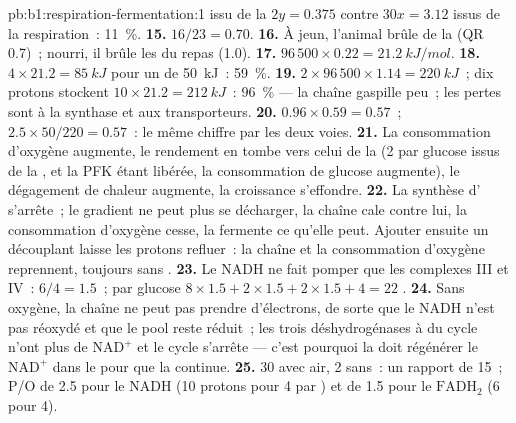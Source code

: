 \begin{solution}{pb:b1:respiration-fermentation:1}
issu de la  $2y = 0.375$ contre $30x = 3.12$ issus de la
respiration~: \qty{11}{\%}.
\textbf{15.} $16/23 = 0.70$.
\textbf{16.} À jeun, l'animal brûle de la  (QR 0.7)~; nourri, il
brûle les  du repas (1.0).
\textbf{17.} $96\,500\times 0.22 = \qty{21.2}{kJ/mol}$.
\textbf{18.} $4\times 21.2 = \qty{85}{kJ}$ pour un  de \qty{50}{kJ}~:
\qty{59}{\%}.
\textbf{19.} $2\times 96\,500\times 1.14 = \qty{220}{kJ}$~; dix protons
stockent $10\times 21.2 = \qty{212}{kJ}$~: \qty{96}{\%} --- la chaîne
gaspille peu~; les pertes sont à la synthase et aux transporteurs.
\textbf{20.} $0.96\times 0.59 = 0.57$~; $2.5\times 50/220 = 0.57$~: le
même chiffre par les deux voies.
\textbf{21.} La consommation d'oxygène augmente, le rendement en 
tombe vers celui de la  (2 par glucose issus de la
, et la PFK étant libérée, la consommation de glucose
augmente), le dégagement de chaleur augmente, la croissance s'effondre.
\textbf{22.} La synthèse d' s'arrête~; le gradient ne peut plus se
décharger, la chaîne cale contre lui, la consommation d'oxygène cesse,
la  fermente ce qu'elle peut. Ajouter ensuite un découplant
laisse les protons refluer~: la chaîne et la consommation d'oxygène
reprennent, toujours sans .
\textbf{23.} Le NADH ne fait pomper que les complexes III et IV~:
$6/4 = 1.5$~; par glucose $8\times 1.5 + 2\times 1.5 + 2\times 1.5 + 4 = 22$ .
\textbf{24.} Sans oxygène, la chaîne ne peut pas prendre d'électrons, de
sorte que le NADH n'est pas réoxydé et que le pool reste réduit~; les
trois déshydrogénases à  du cycle n'ont plus de $\mathrm{NAD^+}$ et
le cycle s'arrête --- c'est pourquoi la  doit régénérer le
$\mathrm{NAD^+}$ dans le  pour que la  continue.
\textbf{25.} 30  avec air, 2 sans~: un rapport de 15~; P/O de 2.5
pour le NADH (10 protons pour 4 par ) et de 1.5 pour le
$\mathrm{FADH_2}$ (6 pour 4).
\end{solution}
